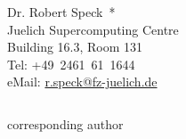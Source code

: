 \documentclass[%
  english,
  hyperref={pdfpagelabels=false},
  aspectratio=1610]{beamer}
\begin{document}
\begin{frame}
\begin{center}
\begin{columns}
      \begin{column}{0.3\textwidth}
        Dr. Robert Speck~*\\
        Juelich Supercomputing Centre\\
        Building 16.3, Room 131\\
        Tel: +49~2461~61~1644\\
        eMail: \href{mailto:r.speck@fz-juelich.de}{r.speck@fz-juelich.de}
      \end{column}
      \begin{column}{0.01\textwidth}
      \end{column}
    \end{columns}
  \end{center}
  \vfill
  {\tiny * corresponding author}
\end{frame}
\end{document}
